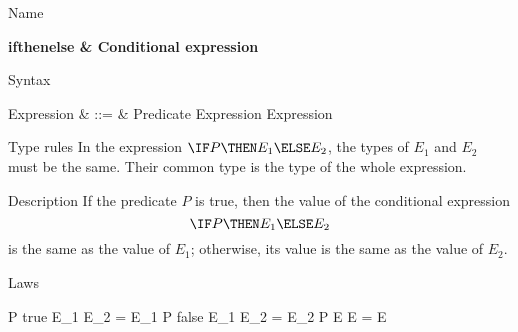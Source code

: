 \begin{manpage}\label{p:condexp}
\item[Name]
\begin{name}
	\bf if\;then\;else & Conditional expression%
		\index{\IFTHENELSE}%
\end{name}

\item[Syntax]
\begin{syntax}
	Expression & ::= &
		\IF Predicate \THEN Expression \ELSE Expression
\end{syntax}

\item[Type rules]
In the expression $\IF P \THEN E_1 \ELSE E_2$, the types of $E_1$
and $E_2$ must be the same.  Their common type is the type of the
whole expression.

\item[Description]
If the predicate $P$ is true, then the value of the conditional
expression 
\[ \IF P \THEN E_1 \ELSE E_2 \]
is the same as the value of $E_1$; otherwise, its value is the same
as the value of $E_2$.

\item[Laws]
\begin{laws}
	P \implies \IF true \THEN E_1 \ELSE E_2 = E_1
\also
	\lnot P \implies \IF false \THEN E_1 \ELSE E_2 = E_2
\also
	\IF P \THEN E \ELSE E = E
\end{laws}
\end{manpage}
